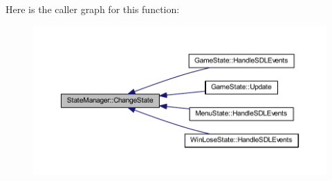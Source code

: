 Here is the caller graph for this function\+:
\nopagebreak
\begin{figure}[H]
\begin{center}
\leavevmode
\includegraphics[width=350pt]{class_state_manager_a8c14290973150a37afdf365d00ffcbba_icgraph}
\end{center}
\end{figure}


